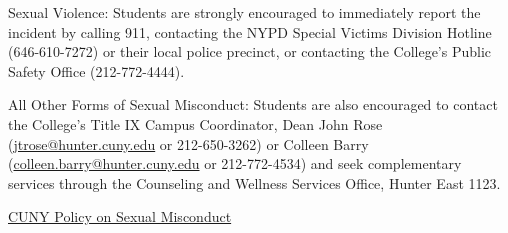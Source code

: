 \documentclass[11pt]{article}
\begin{document}
Sexual Violence: Students are strongly encouraged to immediately report the incident by calling 911, contacting the NYPD Special Victims Division Hotline (646-610-7272) or their local police precinct, or contacting the College's Public Safety Office (212-772-4444).

All Other Forms of Sexual Misconduct: Students are also encouraged to contact the College's Title IX Campus Coordinator, Dean John Rose (\href{mailto:jtrose@hunter.cuny.edu}{jtrose@hunter.cuny.edu} or 212-650-3262) or Colleen Barry (\href{mailto:colleen.barry@hunter.cuny.edu}{colleen.barry@hunter.cuny.edu} or 212-772-4534) and seek complementary services through the Counseling and Wellness Services Office, Hunter East 1123.

\href{http://www.cuny.edu/about/administration/offices/la/Policy-on-Sexual-Misconduct-12-1-14-with-links.pdf}{CUNY Policy on Sexual Misconduct}
\end{document}
